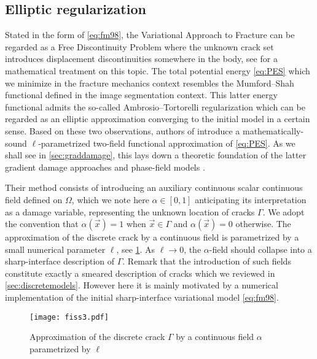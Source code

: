 \subsection{Elliptic regularization} \label{sec:ellipticregul}
Stated in the form of \eqref{eq:fm98}, the Variational Approach to Fracture can be regarded as a Free Discontinuity Problem where the unknown crack set introduces displacement discontinuities somewhere in the body, see \cite{Braides:1998aa} for a mathematical treatment on this topic. The total potential energy \eqref{eq:PES} which we minimize in the fracture mechanics context resembles the Mumford--Shah functional \cite{Mumford:1989aa} defined in the image segmentation context. This latter energy functional admits the so-called Ambrosio--Tortorelli regularization \cite{Ambrosio:1990aa} which can be regarded as an elliptic approximation converging to the initial model in a certain sense. Based on these two observations, authors of \cite{BourdinFrancfortMarigo:2000} introduce a mathematically-sound $\ell$-parametrized two-field functional approximation of \eqref{eq:PES}. As we shall see in \cref{sec:graddamage}, this lays down a theoretic foundation of the latter gradient damage approaches \cite{PhamAmorMarigoMaurini:2011} and phase-field models \cite{MieheHofackerWelschinger:2010}.

Their method consists of introducing an auxiliary continuous scalar continuous field defined on $\Omega$, which we note here $\alpha\in[0,1]$ anticipating its interpretation as a damage variable, representing the unknown location of cracks $\Gamma$. We adopt the convention that $\alpha(\vec{x})=1$ when $\vec{x}\in\Gamma$ and $\alpha(\vec{x})=0$ otherwise. The approximation of the discrete crack by a continuous field is parametrized by a small numerical parameter $\ell$, see \cref{fig:fiss3}. As $\ell\to 0$, the $\alpha$-field should collapse into a sharp-interface description of $\Gamma$. Remark that the introduction of such fields constitute exactly a smeared description of cracks which we reviewed in \cref{sec:discretemodels}. However here it is mainly motivated by a numerical implementation of the initial sharp-interface variational model \eqref{eq:fm98}.
\begin{figure}[htbp]
\centering
\texttt{[image: fiss3.pdf]}
\caption{Approximation of the discrete crack $\Gamma$ by a continuous field $\alpha$ parametrized by $\ell$} \label{fig:fiss3}
\end{figure}

